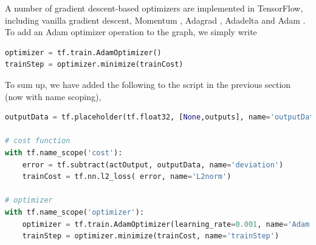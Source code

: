 \documentclass[twoside,english]{uiofysmaster}
\begin{document}
A number of gradient descent-based optimizers are implemented in TensorFlow, including
vanilla gradient descent, Momentum \cite{Qian99}, Adagrad \cite{Duchi11}, Adadelta \cite{Zeiler12} and Adam \cite{Kingma14}.
To add an Adam optimizer operation to the graph, we simply write
\begin{lstlisting}[language=Python]
optimizer = tf.train.AdamOptimizer()
trainStep = optimizer.minimize(trainCost)
\end{lstlisting}
To sum up, we have added the following to the script in the previous section (now with name scoping),
\begin{lstlisting}[language=Python]
outputData = tf.placeholder(tf.float32, [None,outputs], name='outputData')

# cost function
with tf.name_scope('cost'):
    error = tf.subtract(actOutput, outputData, name='deviation')
    trainCost = tf.nn.l2_loss( error, name='L2norm')

# optimizer
with tf.name_scope('optimizer'):
    optimizer = tf.train.AdamOptimizer(learning_rate=0.001, name='Adam')
    trainStep = optimizer.minimize(trainCost, name='trainStep')
\end{lstlisting}
\end{document}
